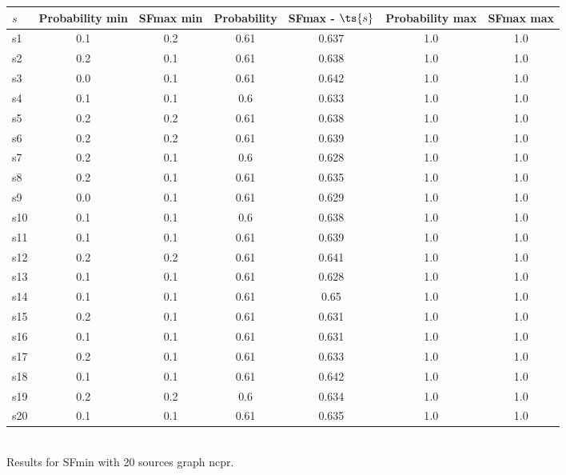 \documentclass{article}
\begin{document}
\noindent\begin{tabular}{|l|c|c|c|c|c|c|}
\hline
$s$& Probability min & SFmax min & Probability & SFmax - $\ts{s}$ & Probability max & SFmax max\\
\hline
s1 &0.1 & 0.2 & 0.61 & 0.637 & 1.0 & 1.0\\
\hline
s2 &0.2 & 0.1 & 0.61 & 0.638 & 1.0 & 1.0\\
\hline
s3 &0.0 & 0.1 & 0.61 & 0.642 & 1.0 & 1.0\\
\hline
s4 &0.1 & 0.1 & 0.6 & 0.633 & 1.0 & 1.0\\
\hline
s5 &0.2 & 0.2 & 0.61 & 0.638 & 1.0 & 1.0\\
\hline
s6 &0.2 & 0.2 & 0.61 & 0.639 & 1.0 & 1.0\\
\hline
s7 &0.2 & 0.1 & 0.6 & 0.628 & 1.0 & 1.0\\
\hline
s8 &0.2 & 0.1 & 0.61 & 0.635 & 1.0 & 1.0\\
\hline
s9 &0.0 & 0.1 & 0.61 & 0.629 & 1.0 & 1.0\\
\hline
s10 &0.1 & 0.1 & 0.6 & 0.638 & 1.0 & 1.0\\
\hline
s11 &0.1 & 0.1 & 0.61 & 0.639 & 1.0 & 1.0\\
\hline
s12 &0.2 & 0.2 & 0.61 & 0.641 & 1.0 & 1.0\\
\hline
s13 &0.1 & 0.1 & 0.61 & 0.628 & 1.0 & 1.0\\
\hline
s14 &0.1 & 0.1 & 0.61 & 0.65 & 1.0 & 1.0\\
\hline
s15 &0.2 & 0.1 & 0.61 & 0.631 & 1.0 & 1.0\\
\hline
s16 &0.1 & 0.1 & 0.61 & 0.631 & 1.0 & 1.0\\
\hline
s17 &0.2 & 0.1 & 0.61 & 0.633 & 1.0 & 1.0\\
\hline
s18 &0.1 & 0.1 & 0.61 & 0.642 & 1.0 & 1.0\\
\hline
s19 &0.2 & 0.2 & 0.6 & 0.634 & 1.0 & 1.0\\
\hline
s20 &0.1 & 0.1 & 0.61 & 0.635 & 1.0 & 1.0\\
\hline
\end{tabular}\\

\noindent Results for SFmin with 20 sources graph ncpr.
\end{document}
